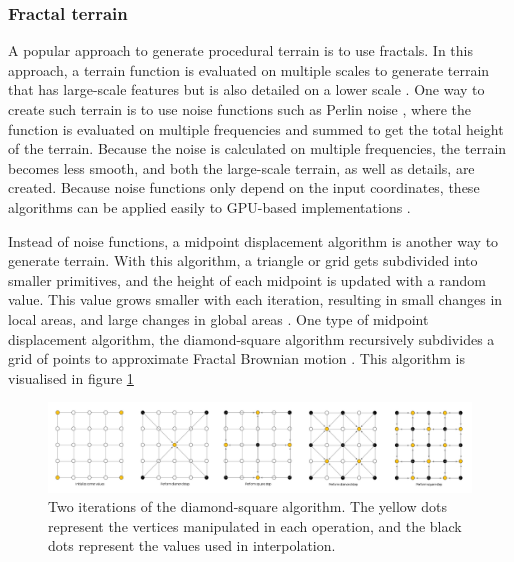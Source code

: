 \documentclass{article}
\begin{document}
\subsubsection{Fractal terrain} 
A popular approach to generate procedural terrain is to use fractals. In this approach, a terrain function is evaluated on multiple scales to generate terrain that has large-scale features but is also detailed on a lower scale \cite{shaker_procedural_2016}. One way to create such terrain is to use noise functions such as Perlin noise \cite{musgrave_synthesis_1989}, where the function is evaluated on multiple frequencies and summed to get the total height of the terrain. Because the noise is calculated on multiple frequencies, the terrain becomes less smooth, and both the large-scale terrain, as well as details, are created. 
Because noise functions only depend on the input coordinates, these algorithms can be applied easily to GPU-based implementations \cite{schneider_real-time_2006}. 

Instead of noise functions, a midpoint displacement algorithm is another way to generate terrain. With this algorithm, a triangle or grid gets subdivided into smaller primitives, and the height of each midpoint is updated with a random value. This value grows smaller with each iteration, resulting in small changes in local areas, and large changes in global areas \cite{sala_mathematics_2002}. One type of midpoint displacement algorithm, the diamond-square algorithm recursively subdivides a grid of points to approximate Fractal Brownian motion \cite{miller_definition_1986}. This algorithm is visualised in figure \ref{fig:diamond_square}

\begin{figure}
    \centering
    \includegraphics[width=\textwidth]{figures/Diamond_Square}
    \caption{Two iterations of the diamond-square algorithm. The yellow dots represent the vertices manipulated in each operation, and the black dots represent the values used in interpolation\protect\footnotemark.}
    \label{fig:diamond_square}
\end{figure}

\end{document}
